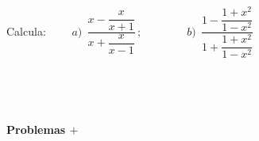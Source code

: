 \begin{mipropuesto}

Calcula: $\qquad a)\ \ \dfrac{x-\dfrac{x}{x+1}}{x+\dfrac{x}{x-1}} \, ; \qquad \qquad b)\ \ \dfrac{1-\dfrac{1+x^2}{1-x^2}}{1+\dfrac{1+x^2}{1-x^2}}$
\end{mipropuesto}

\vspace{-8mm}
\begin{flushright}
	\begin{footnotesize} \textcolor{gris}{}	\end{footnotesize}
\end{flushright}



\newpage

$\quad$

$\quad$


\begin{adjustwidth}{50pt}{250pt}
\begin{cuadro-naranja}
\textbf{\huge{Problemas $\boldsymbol{+}$}}\normalsize{$\, $}
\end{cuadro-naranja}	
\end{adjustwidth}

